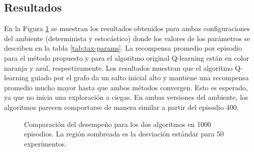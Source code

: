 \subsection{Resultados}

En la Figura \ref{fig:results-taxi} se muestran los resultados obtenidos
para ambas configuraciones del ambiente (determinista y estocástico) donde
los valores de los parámetros se describen en la tabla \ref{tab:tax-params}.
La recompensa promedio por episodio para el método propuesto y para el algoritmo
original Q-learning están en color naranja y azul, respectivamente. 
Los resultados muestran que el algoritmo Q-learning guiado por el grafo da un salto inicial alto y mantiene una recompensa promedio mucho mayor hasta que ambos métodos convergen. Esto es esperado, ya que
no inicia una exploración a ciegas. En ambas versiones del ambiente, los algoritmos parecen comportarse de manera similar a partir del episodio 400.

\begin{figure}[H]
  \centering
  \hfill
  \caption{Comparación del desempeño para los dos algoritmos en 1000 episodios. La región sombreada es la desviación estándar para 50 experimentos.}
  \label{fig:results-taxi}
\end{figure}


